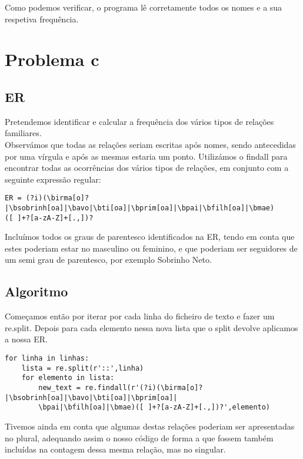 \documentclass[11pt,a4paper]{report}%
\begin{document}
Como podemos verificar, o programa lê corretamente todos os nomes e a sua respetiva frequência.

\section{Problema c}

\subsection{ER}

Pretendemos identificar e calcular a frequência dos vários tipos de relações familiares.\\
Observámos que todas as relações seriam escritas após nomes, sendo antecedidas por uma vírgula e após as mesmas estaria um ponto. 
Utilizámos o findall para encontrar todas as ocorrências dos vários tipos de relações, em conjunto com a seguinte expressão regular:

\begin{verbatim}
ER = (?i)(\birma[o]?|\bsobrinh[oa]|\bavo|\bti[oa]|\bprim[oa]|\bpai|\bfilh[oa]|\bmae)
([ ]+?[a-zA-Z]+[.,])?
\end{verbatim}

Incluímos todos os graus de parentesco identificados na ER, tendo em conta que estes poderiam estar no masculino ou feminino, e que poderiam ser seguidores de um semi grau de parentesco, por exemplo Sobrinho Neto.



\subsection{Algoritmo}

Começamos então por iterar por cada linha do ficheiro de texto e fazer um re.split. Depois para cada elemento nessa nova lista que o split devolve aplicamos a nossa ER.

\begin{verbatim}
for linha in linhas: 
    lista = re.split(r'::',linha)
    for elemento in lista: 
        new_text = re.findall(r'(?i)(\birma[o]?|\bsobrinh[oa]|\bavo|\bti[oa]|\bprim[oa]|
        \bpai|\bfilh[oa]|\bmae)([ ]+?[a-zA-Z]+[.,])?',elemento)

\end{verbatim}

\newpage

Tivemos ainda em conta que algumas destas relações poderiam ser apresentadas no plural, adequando assim o nosso código de forma a que fossem também incluídas na contagem dessa mesma relação, mas no singular.
\end{document}
